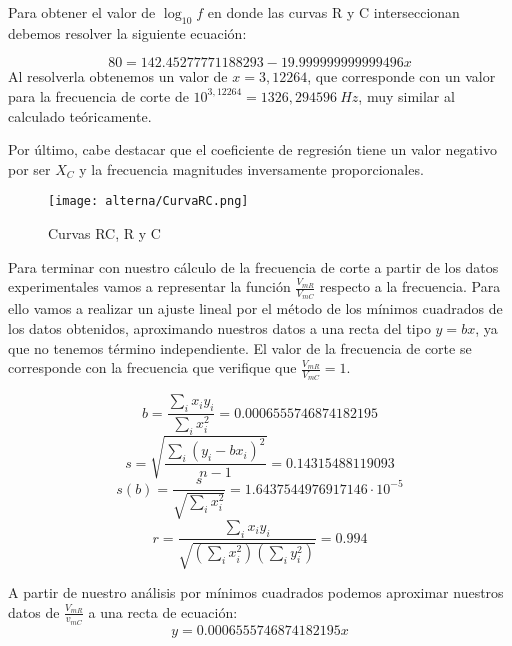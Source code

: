 \documentclass[a4paper,12pt,titlepage]{article}
\begin{document}
Para obtener el valor de $\log_{10}f$ en donde las curvas R y C interseccionan debemos resolver la siguiente ecuación:

\begin{equation}
    80=142.45277771188293-19.999999999999496x
\end{equation}
Al resolverla obtenemos un valor de $x=3,12264$, que corresponde con un valor para la frecuencia de corte de $10^{3,12264}=1326,294596\: Hz$, muy similar al calculado teóricamente.

\par Por último, cabe destacar que el coeficiente de regresión tiene un valor negativo por ser $X_{C}$ y la frecuencia magnitudes inversamente proporcionales.
\newpage

\begin{figure}[h!]
    \centering
    \texttt{[image: alterna/CurvaRC.png]}
    \caption{Curvas RC, R y C}
    \label{CurvaRC}
\end{figure}

Para terminar con nuestro cálculo de la frecuencia de corte a partir de los datos experimentales vamos a representar la función $\frac{V_{mR}}{V_{mC}}$   respecto a la frecuencia. Para ello vamos a realizar un ajuste lineal por el método de los mínimos cuadrados de los datos obtenidos, aproximando nuestros datos a una recta del tipo $y = bx$, ya que no tenemos término independiente. El valor de la frecuencia de corte se corresponde con la frecuencia que verifique que $\frac{V_{mR}}{V_{mC}}=1$.

\begin{equation}
    b=\frac{\sum_{i}x_{i}y_{i}}{\sum_{i}x_{i}^2}=0.0006555746874182195
\end{equation}
\begin{equation}
    s=\sqrt{\frac{\sum_{i}(y_{i}-bx_{i})^2}{n-1}}=0.14315488119093
\end{equation}
\begin{equation}
    s(b)=\frac{s}{\sqrt{\sum_{i}x_{i}^2}}=1.6437544976917146 \cdot 10^{-5}
\end{equation}
\begin{equation}
    r=\frac{\sum_{i}x_{i}y_{i}}{\sqrt{(\sum_{i}x_{i}^2)(\sum_{i}y_{i}^2)}}=0.994
\end{equation}
\newline

A partir de nuestro análisis por mínimos cuadrados podemos aproximar nuestros datos de $\frac{V_{mR}}{v_{mC}}$ a una recta de ecuación:
\begin{equation}
    y=0.0006555746874182195x
\end{equation}
\end{document}
